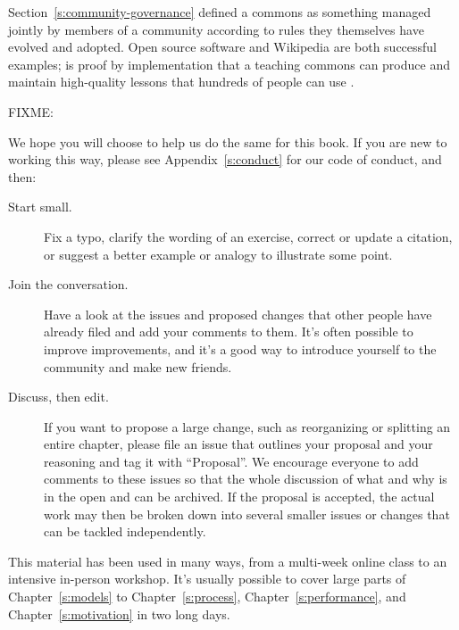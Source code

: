 
Section~\ref{s:community-governance} defined a commons as
something managed jointly by members of a community
according to rules they themselves have evolved and adopted.
Open source software and Wikipedia are both successful examples;
 is proof by implementation that
a teaching commons can produce and maintain high-quality lessons
that hundreds of people can use \cite{Wils2016}.

FIXME: \cite{Deve2018}

We hope you will choose to help us do the same for this book.
If you are new to working this way,
please see Appendix~\ref{s:conduct} for our code of conduct,
and then:

\begin{description}

\item[Start small.]
  Fix a typo,
  clarify the wording of an exercise,
  correct or update a citation,
  or suggest a better example or analogy to illustrate some point.

\item[Join the conversation.]
  Have a look at the issues and proposed changes that other people have already filed
  and add your comments to them.
  It's often possible to improve improvements,
  and it's a good way to introduce yourself to the community and make new friends.

\item[Discuss, then edit.]
  If you want to propose a large change,
  such as reorganizing or splitting an entire chapter,
  please file an issue that outlines your proposal and your reasoning and tag it with ``Proposal''.
  We encourage everyone to add comments to these issues
  so that the whole discussion of what and why is in the open and can be archived.
  If the proposal is accepted,
  the actual work may then be broken down into several smaller issues or changes
  that can be tackled independently.

\end{description}


This material has been used in many ways,
from a multi-week online class to an intensive in-person workshop.
It's usually possible to cover large parts of Chapter~\ref{s:models} to Chapter~\ref{s:process},
Chapter~\ref{s:performance},
and Chapter~\ref{s:motivation} in two long days.

